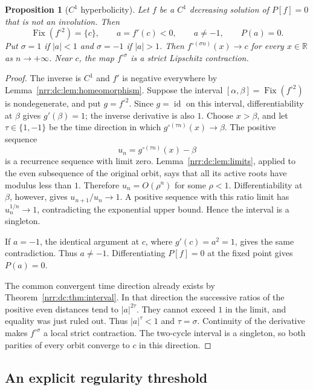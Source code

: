 \documentclass[11pt,letterpaper]{article}
\newtheorem{proposition}[theorem]{Proposition}
\theoremstyle{definition}
\theoremstyle{remark}
\newcommand{\R}{\mathbb R}
\newcommand{\id}{\operatorname{id}}
\DeclareMathOperator{\Fix}{Fix}
\begin{document}
\begin{proposition}[$C^1$ hyperbolicity]
\label{nrr:dc:prop:c1}
Let $f$ be a $C^1$ decreasing solution of $P[f]=0$ that is not an
involution. Then
\begin{equation}
 \Fix(f^{\circ2})=\{c\},\qquad a=f'(c)<0,\qquad a\ne-1,
 \qquad P(a)=0.
 \label{nrr:dc:eq:hyperbolic}
\end{equation}
Put $\sigma=1$ if $|a|<1$ and $\sigma=-1$ if $|a|>1$.
Then $f^{\circ(\sigma n)}(x)\to c$ for every $x\in\R$ as
$n\to+\infty$. Near $c$, the map $f^{\circ\sigma}$ is a strict
Lipschitz contraction.
\end{proposition}
\begin{proof}
The inverse is $C^1$ and $f'$ is negative everywhere by
Lemma~\ref{nrr:dc:lem:homeomorphism}. Suppose the interval
$[\alpha,\beta]=\Fix(f^{\circ2})$ is nondegenerate, and put
$g=f^{\circ2}$. Since $g=\id$ on this interval, differentiability at
$\beta$ gives $g'(\beta)=1$; the inverse derivative is also $1$.
Choose $x>\beta$, and let $\tau\in\{1,-1\}$ be the time direction
in which $g^{\circ(\tau n)}(x)\to\beta$. The positive sequence
\[
 u_n=g^{\circ(\tau n)}(x)-\beta
\]
is a recurrence sequence with limit zero. Lemma~\ref{nrr:dc:lem:limits},
applied to the even subsequence of the original orbit, says that all
its active roots have modulus less than $1$. Therefore
$u_n=O(\rho^n)$ for some $\rho<1$. Differentiability at $\beta$,
however, gives $u_{n+1}/u_n\to1$. A positive sequence with this ratio
limit has $u_n^{1/n}\to1$, contradicting the exponential upper bound.
Hence the interval is a singleton.

If $a=-1$, the identical argument at $c$, where $g'(c)=a^2=1$,
gives the same contradiction. Thus $a\ne-1$. Differentiating
$P[f]=0$ at the fixed point gives $P(a)=0$.

The common convergent time direction already exists by
Theorem~\ref{nrr:dc:thm:interval}. In that direction the successive ratios
of the positive even distances tend to $|a|^{2\tau}$.
They cannot exceed $1$ in the limit, and equality was just ruled out.
Thus $|a|^\tau<1$ and $\tau=\sigma$. Continuity of the derivative
makes $f^{\circ\sigma}$ a local strict contraction. The two-cycle
interval is a singleton, so both parities of every orbit converge
to $c$ in this direction.
\end{proof}

\subsection{An explicit regularity threshold}
\end{document}
